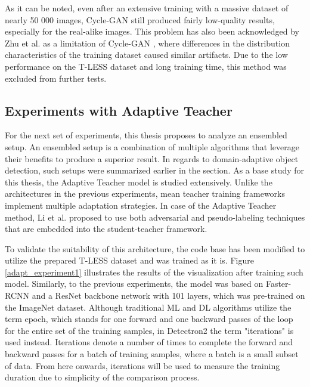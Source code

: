 As it can be noted, even after an extensive training with a massive dataset of nearly 50 000 images, Cycle-GAN still produced fairly low-quality results, especially for the real-alike images. This problem has also been acknowledged by Zhu et al. as a limitation of Cycle-GAN \cite{Zhu2017}, where differences in the distribution characteristics of the training dataset caused similar artifacts. Due to the low performance on the T-LESS dataset and long training time, this method was excluded from further tests. 

\FloatBarrier

\subsection{Experiments with Adaptive Teacher}
\label{ensemExp} 
For the next set of experiments, this thesis proposes to analyze an ensembled setup. An ensembled setup is a combination of multiple algorithms that leverage their benefits to produce a superior result. In regards to domain-adaptive object detection, such setups were summarized earlier in the  section. As a base study for this thesis, the Adaptive Teacher \cite{Li2021} model is studied extensively. Unlike the architectures in the previous experiments, mean teacher training frameworks implement multiple adaptation strategies. In case of the Adaptive Teacher method, Li et al. proposed to use both adversarial and pseudo-labeling techniques that are embedded into the student-teacher framework. 

To validate the suitability of this architecture, the code base has been modified to utilize the prepared T-LESS dataset and was trained as it is. Figure \ref{adapt_experiment1} illustrates the results of the visualization after training such model. Similarly, to the previous experiments, the model was based on Faster-RCNN \cite{ima} and a ResNet \cite{He2015} backbone network with 101 layers, which was pre-trained on the ImageNet  \cite{Russakovsky2014} dataset. Although traditional ML and DL algorithms utilize the term epoch, which stands for one forward and one backward passes of the loop for the entire set of the training samples, in Detectron2 \cite{wu2019Detectron2} the term "iterations" is used instead. Iterations denote a number of times to complete the forward and backward passes for a batch of training samples, where a batch is a small subset of data. From here onwards, iterations will be used to measure the training duration due to simplicity of the comparison process. 


